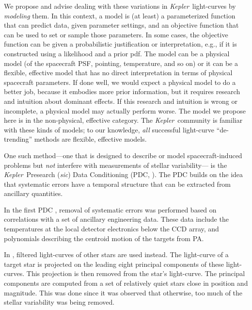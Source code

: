 \documentclass[12pt, preprint]{aastex}
\newcommand{\notenglish}[1]{\textit{#1}}
\newcommand{\sic}{\notenglish{sic}}
\newcommand{\project}[1]{\textsl{#1}}
\newcommand{\Kepler}{\project{Kepler}}
\begin{document}
We propose and advise dealing with these variations in \Kepler\ light-curves by \emph{modeling} them.
In this context, a model is (at least) a parameterized function that can predict data, given parameter settings,
  and an objective function that can be used to set or sample those parameters.
In some cases, the objective function can be given a probabilistic justification or interpretation, e.g., if it is constructed using a likelihood and a prior pdf.
The model can be a physical model (of the spacecraft PSF, pointing, temperature, and so on)
  or it can be a flexible, effective model that has no direct interpretation in terms of physical spacecraft parameters.
If done well, we would expect a physical model to do a better job,
  because it embodies more prior information,
  but it requires research and intuition about dominant effects. 
If this research and intuition is wrong or incomplete, a physical model may actually perform worse.
The model we propose here is in the non-physical, effective category.
The \Kepler\ community is familiar with these kinds of models;
  to our knowledge, \emph{all} successful light-curve ``de-trending'' methods
  are flexible, effective models.

One such method---one that is designed to describe or model spacecraft-induced problems
  but \emph{not} interfere with measurements of stellar variability---%
  is the \Kepler\ Presearch (\sic) Data Conditioning (PDC, \cite{pdc1}).
The PDC builds on the idea that systematic errors have a temporal structure that can be extracted from ancillary quantities. 
%

In the first PDC \citep{pdc1}, 
  removal of systematic errors was performed based on correlations with a set of ancillary engineering data. 
These data include the temperatures at the local detector electronics below the CCD array, 
  and polynomials describing the centroid motion of the targets from PA.

In \cite{pdc2,pdc3}, filtered light-curves of other stars are used instead. 
The light-curve of a target star is projected on the leading eight principal components of these light-curves. 
This projection is then removed from the star's light-curve. 
The principal components are computed from a set of relatively quiet stars close in position and magnitude. 
This was done since it was observed that otherwise, too much of the stellar variability was being removed. 
\end{document}
